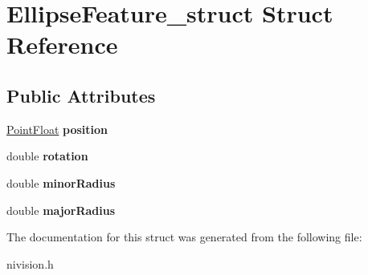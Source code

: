 \hypertarget{structEllipseFeature__struct}{
\section{EllipseFeature\_\-struct Struct Reference}
\label{structEllipseFeature__struct}
}
\subsection*{Public Attributes}
\begin{DoxyCompactItemize}
\item 
\hypertarget{structEllipseFeature__struct_a8035288e4c6c786947fbf9c434379f18}{
\hyperlink{structPointFloat__struct}{PointFloat} {\bfseries position}}
\label{structEllipseFeature__struct_a8035288e4c6c786947fbf9c434379f18}

\item 
\hypertarget{structEllipseFeature__struct_a2eacfab5a1199f073f3d97f8201e5dc8}{
double {\bfseries rotation}}
\label{structEllipseFeature__struct_a2eacfab5a1199f073f3d97f8201e5dc8}

\item 
\hypertarget{structEllipseFeature__struct_ab46beac6ad0159d5afdd1d5546388930}{
double {\bfseries minorRadius}}
\label{structEllipseFeature__struct_ab46beac6ad0159d5afdd1d5546388930}

\item 
\hypertarget{structEllipseFeature__struct_a4e08343ddfbf396c48d0a20eed7298e8}{
double {\bfseries majorRadius}}
\label{structEllipseFeature__struct_a4e08343ddfbf396c48d0a20eed7298e8}

\end{DoxyCompactItemize}


The documentation for this struct was generated from the following file:\begin{DoxyCompactItemize}
\item 
nivision.h\end{DoxyCompactItemize}
